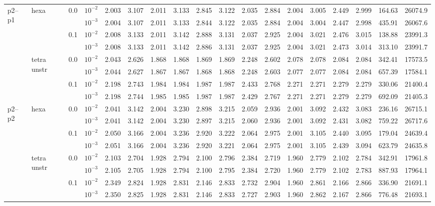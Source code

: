\begin{longtable}{llclrrrrrrrrrrrrrr}
\multirow{8}{*}{p2--p1} & \multirow{4}{*}{hexa} & \multirow{2}{*}{0.0} & $10^{-2}$ & 2.003 & 3.107 & 2.011 & 3.133 & 2.845 & 3.122 & 2.035 & 2.884 & 2.004 & 3.005 & 2.449 & 2.999 & 164.63 & 26074.9 \\
& & & $10^{-3}$ & 2.004 & 3.107 & 2.011 & 3.133 & 2.844 & 3.122 & 2.035 & 2.884 & 2.004 & 3.004 & 2.447 & 2.998 & 435.91 & 26067.6 \\\cline{3-18}
& & \multirow{2}{*}{0.1} & $10^{-2}$ & 2.008 & 3.133 & 2.011 & 3.142 & 2.888 & 3.131 & 2.037 & 2.925 & 2.004 & 3.021 & 2.476 & 3.015 & 138.88 & 23991.3 \\
& & & $10^{-3}$ & 2.008 & 3.133 & 2.011 & 3.142 & 2.886 & 3.131 & 2.037 & 2.925 & 2.004 & 3.021 & 2.473 & 3.014 & 313.10 & 23991.7 \\\cline{2-18}
& \multirow{4}{*}{tetra unstr} & \multirow{2}{*}{0.0} & $10^{-2}$ & 2.043 & 2.626 & 1.868 & 1.868 & 1.869 & 1.869 & 2.248 & 2.602 & 2.078 & 2.078 & 2.084 & 2.084 & 342.41 & 17573.5 \\
& & & $10^{-3}$ & 2.044 & 2.627 & 1.867 & 1.867 & 1.868 & 1.868 & 2.248 & 2.603 & 2.077 & 2.077 & 2.084 & 2.084 & 657.39 & 17584.1 \\\cline{3-18}
& & \multirow{2}{*}{0.1} & $10^{-2}$ & 2.198 & 2.743 & 1.984 & 1.984 & 1.987 & 1.987 & 2.433 & 2.768 & 2.271 & 2.271 & 2.279 & 2.279 & 330.06 & 21400.4 \\
& & & $10^{-3}$ & 2.198 & 2.744 & 1.985 & 1.985 & 1.987 & 1.987 & 2.429 & 2.767 & 2.271 & 2.271 & 2.279 & 2.279 & 692.09 & 21405.3 \\\hline

\multirow{8}{*}{p2--p2} & \multirow{4}{*}{hexa} & \multirow{2}{*}{0.0} & $10^{-2}$ & 2.041 & 3.142 & 2.004 & 3.230 & 2.898 & 3.215 & 2.059 & 2.936 & 2.001 & 3.092 & 2.432 & 3.083 & 236.16 & 26715.1 \\
& & & $10^{-3}$ & 2.041 & 3.142 & 2.004 & 3.230 & 2.897 & 3.215 & 2.060 & 2.936 & 2.001 & 3.092 & 2.431 & 3.082 & 759.22 & 26717.6 \\\cline{3-18}
& & \multirow{2}{*}{0.1} & $10^{-2}$ & 2.050 & 3.166 & 2.004 & 3.236 & 2.920 & 3.222 & 2.064 & 2.975 & 2.001 & 3.105 & 2.440 & 3.095 & 179.04 & 24639.4 \\
& & & $10^{-3}$ & 2.051 & 3.166 & 2.004 & 3.236 & 2.920 & 3.221 & 2.064 & 2.975 & 2.001 & 3.105 & 2.439 & 3.094 & 623.79 & 24635.8 \\\cline{2-18}
& \multirow{4}{*}{tetra unstr} & \multirow{2}{*}{0.0} & $10^{-2}$ & 2.103 & 2.704 & 1.928 & 2.794 & 2.100 & 2.796 & 2.384 & 2.719 & 1.960 & 2.779 & 2.102 & 2.784 & 342.91 & 17961.8 \\
& & & $10^{-3}$ & 2.105 & 2.705 & 1.928 & 2.794 & 2.100 & 2.795 & 2.384 & 2.720 & 1.960 & 2.779 & 2.102 & 2.783 & 887.93 & 17964.1 \\\cline{3-18}
& & \multirow{2}{*}{0.1} & $10^{-2}$ & 2.349 & 2.824 & 1.928 & 2.831 & 2.146 & 2.833 & 2.732 & 2.904 & 1.960 & 2.861 & 2.166 & 2.866 & 336.90 & 21691.1 \\
& & & $10^{-3}$ & 2.350 & 2.825 & 1.928 & 2.831 & 2.146 & 2.833 & 2.727 & 2.903 & 1.960 & 2.862 & 2.167 & 2.866 & 776.48 & 21693.1 \\\hline


\end{longtable}
